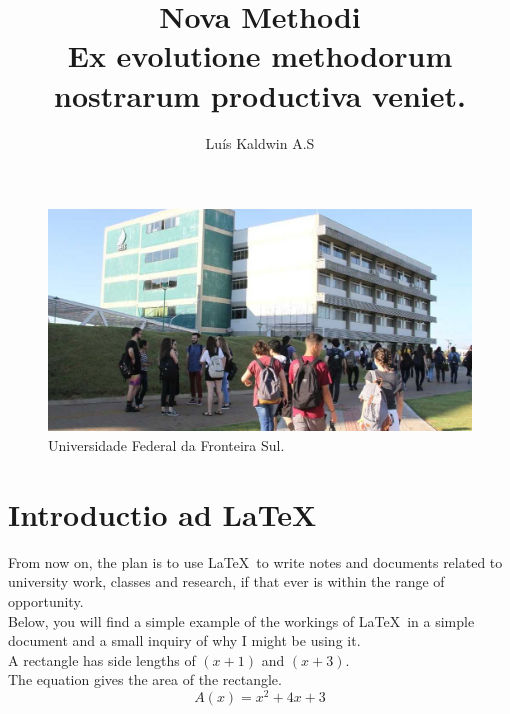\documentclass[11pt]{article}
\begin{document}
\begin{figure}[!ht]
    \title{Nova Methodi \\
    \large Ex evolutione methodorum nostrarum productiva veniet.}
    \author{Luís Kaldwin A.S}
    \maketitle
    \includegraphics[width=\linewidth]{cover.jpg} 
    \caption{Universidade Federal da Fronteira Sul.}
    \label{fig:cover}
\end{figure}
\pagebreak

\section{Introductio ad \LaTeX}
From now on, the plan is to use \LaTeX\ to write notes and documents related to 
university work, classes and research, if that ever is within the range of opportunity. \\
Below, you will find a simple example of the workings of \LaTeX\ in a simple document and a small 
inquiry of why I might be using it. 
\\

A rectangle has side lengths of $(x+1)$ and $(x+3)$. \\
The equation gives the area of the rectangle. \\
\[A(x) = x^2 + 4x + 3\]
\end{document}
